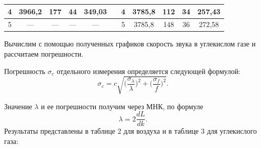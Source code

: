 \documentclass[11pt,a4paper,oneside]{article}
\begin{document}
\begin{enumerate}
\begin{center}
\begin{table}[h!]
\begin{tabular}{ccccccccccc}
\multicolumn{1}{|c|}{4}          & \multicolumn{1}{c|}{3966,2}         & \multicolumn{1}{c|}{177}            & \multicolumn{1}{c|}{44}                      & \multicolumn{1}{c|}{349,03}          & \multicolumn{1}{c|}{}          & \multicolumn{1}{c|}{4}          & \multicolumn{1}{c|}{3785,8}         & \multicolumn{1}{c|}{112}            & \multicolumn{1}{c|}{34}                     & \multicolumn{1}{c|}{257,43}          \\ \hline
\multicolumn{1}{|c|}{5}          & \multicolumn{1}{c|}{---}            & \multicolumn{1}{c|}{---}            & \multicolumn{1}{c|}{---}                     & \multicolumn{1}{c|}{---}             & \multicolumn{1}{c|}{}          & \multicolumn{1}{c|}{5}          & \multicolumn{1}{c|}{3785,8}         & \multicolumn{1}{c|}{148}            & \multicolumn{1}{c|}{36}                     & \multicolumn{1}{c|}{272,58}          \\ \hline
\end{tabular}

\end{table}
\end{center}
		\newpage
		Вычислим с помощью полученных графиков скорость звука в углекислом газе и рассчитаем погрешности.
		
		Погрешность $\sigma_{c}$ отдельного измерения определяется следующей формулой:
		$$ \sigma_{c} =c \sqrt{\Big(\frac{\sigma_{\lambda}}{\lambda}\Big)^2+ \Big(\frac{\sigma_{f}}{f}\Big)^2}.$$
		
		Значение $ \lambda $ и ее погрешности получим через МНК, по формуле 
		$$ \lambda = 2 \dfrac{dL}{dk}.$$
		Результаты представлены в таблице 2 для воздуха и в таблице 3 для углекислого газа:



\end{enumerate}
\end{document}
